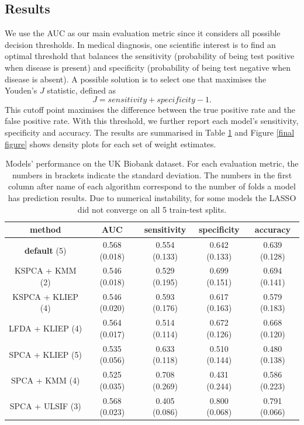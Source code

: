 \documentclass[a4paper,12pt]{article}
\begin{document}
\subsection{Results} \label{bio res}
We use the AUC as our main evaluation metric since it considers all possible decision thresholds. In medical diagnosis, one scientific interest is to find an optimal threshold that balances the sensitivity (probability of being test positive when disease is present) and specificity (probability of being test negative when disease is absent). A possible solution is to select one that maximises the Youden's $J$ statistic, defined as $$J = sensitivity + specificity - 1.$$
This cutoff point maximises the difference between the true positive rate and the false positive rate. With this threshold, we further report each model's sensitivity, specificity and accuracy. The results are summarised in Table \ref{final table} and Figure \ref{final figure} shows density plots for each set of weight estimates.

\begin{table}[H]
	\centering
\begin{tabular} {c | c | c | c | c }
method & AUC & sensitivity & specificity & accuracy  \\
\hline \hline
 \textbf{default} (5) & 0.568 (0.018) & 0.554 (0.133) & 0.642 (0.133) & 0.639 (0.128) \\
 KSPCA + KMM (2) & 0.546 (0.018) & 0.529 (0.195) & 0.699 (0.151) & 0.694 (0.141) \\
 KSPCA + KLIEP (4) & 0.546 (0.020) & 0.593 (0.176) & 0.617 (0.163) & 0.579 (0.183) \\
 LFDA + KLIEP (4)& 0.564 (0.017) & 0.514 (0.114) & 0.672 (0.126) & 0.668 (0.120) \\
 SPCA + KLIEP (5) & 0.535 (0.056) & 0.633 (0.118) & 0.510 (0.144) & 0.480 (0.138) \\
 SPCA + KMM (4)& 0.525 (0.035) & 0.708 (0.269) & 0.431 (0.244) & 0.586 (0.223) \\
 SPCA + ULSIF (3)& 0.568 (0.023) & 0.405 (0.086) & 0.800 (0.068) & 0.791 (0.066) \\
\hline \hline
\end{tabular}	
\caption{Models' performance on the UK Biobank dataset. For each evaluation metric, the numbers in brackets indicate the standard deviation. The numbers in the first column after name of each algorithm correspond to the number of folds a model has prediction results. Due to numerical instability, for some models the LASSO did not converge on all 5 train-test splits.}
\label{final table}
\end{table}
\end{document}
